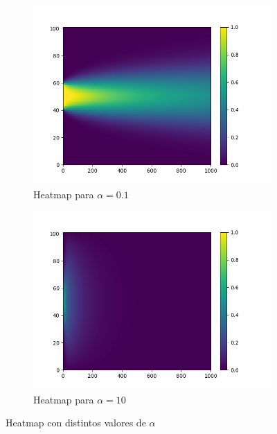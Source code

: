 \begin{figure}[H]
      \centering
      \begin{subfigure}{.5\textwidth}
            \centering
            \includegraphics[width=\textwidth]{graficos/difusion-alpha01.png}
            \caption{Heatmap para $\alpha = 0.1$}
            \label{fig:heatmap_alpha_01}
      \end{subfigure}%
      \begin{subfigure}{.5\textwidth}
            \centering
            \includegraphics[width=\textwidth]{graficos/difusion-alpha10.png}
            \caption{Heatmap para $\alpha = 10$}
            \label{fig:heatmap_alpha_10}
      \end{subfigure}
      \caption{Heatmap con distintos valores de $\alpha$}
      \label{fig:heatmap_diff_alpha}
\end{figure}

